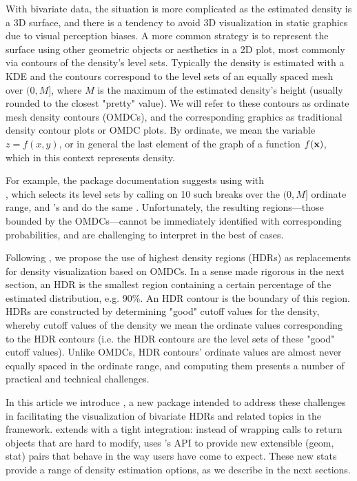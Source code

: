 With bivariate data, the situation is more complicated as the estimated density is a 3D surface, and there is a tendency to avoid 3D visualization in static graphics due to visual perception biases.
A more common strategy is to represent the surface using other geometric objects or aesthetics in a 2D plot, most commonly via contours of the density's level sets.
Typically the density is estimated with a KDE and the contours correspond to the level sets of an equally spaced mesh over $(0,M]$, where $M$ is the maximum of the estimated density's height (usually rounded to the closest "pretty" value).
We will refer to these contours as ordinate mesh density contours (OMDCs), and the corresponding graphics as traditional density contour plots or OMDC plots.
By ordinate, we mean the variable $z = f(x,y)$, or in general the last element of the graph of a function $f(\textbf{x})$, which in this context represents density.

For example, the  package documentation suggests using  with \\ , which selects its level sets by calling  on 10 such breaks over the $(0,M]$ ordinate range, and 's  and  do the same \citep{mass, wickham_ggplot2_2009, wilkinson_grammar_2005}.
Unfortunately, the resulting regions---those bounded by the OMDCs---cannot be immediately identified with corresponding probabilities, and are challenging to interpret in the best of cases.

Following \cite{hyndman_computing_1996}, we propose the use of highest density regions (HDRs) as replacements for density visualization based on OMDCs.
In a sense made rigorous in the next section, an HDR is the smallest region containing a certain percentage of the estimated distribution, e.g. 90\%.
An HDR contour is the boundary of this region.
HDRs are constructed by determining "good" cutoff values for the density, whereby cutoff values of the density we mean the ordinate values corresponding to the HDR contours
(i.e. the HDR contours are the level sets of these "good" cutoff values).
Unlike OMDCs, HDR contours' ordinate values are almost never equally spaced in the ordinate range, and computing them presents a number of practical and technical challenges.

In this article we introduce , a new  package intended to address these challenges in facilitating the visualization of bivariate HDRs and related topics in the  framework.
 extends  with a tight integration: instead of wrapping  calls to return  objects that are hard to modify,  uses 's API to provide new extensible (geom, stat) pairs that behave in the way  users have come to expect.
These new stats provide a range of density estimation options, as we describe in the next sections.

